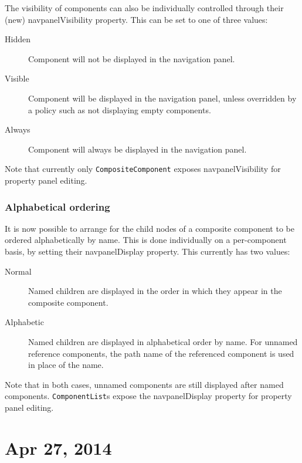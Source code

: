 \documentclass{article}
\begin{document}
The visibility of components can also be individually controlled
through their (new) {\sf navpanelVisibility} property. This can be set
to one of three values:

\begin{description}

\item[Hidden] Component will not be displayed in the navigation panel.

\item[Visible] Component will be displayed in the navigation panel,
unless overridden by a policy such as not displaying empty components.

\item[Always] Component will always be displayed in the navigation panel.

\end{description}

Note that currently only {\tt CompositeComponent} exposes {\sf
navpanelVisibility} for property panel editing.

\subsubsection*{Alphabetical ordering}

It is now possible to arrange for the child nodes of a composite
component to be ordered alphabetically by name. This is done
individually on a per-component basis, by setting their {\sf
navpanelDisplay} property. This currently has two values:

\begin{description}

\item[Normal] Named children are displayed in the order in which they appear
in the composite component.

\item[Alphabetic] Named children are displayed in alphabetical order
by name. For unnamed reference components, the path name of the
referenced component is used in place of the name.

\end{description}

Note that in both cases, unnamed components are still displayed after
named components. {\tt ComponentList}s expose the {\sf navpanelDisplay}
property for property panel editing.

\section*{Apr 27, 2014}
\end{document}

